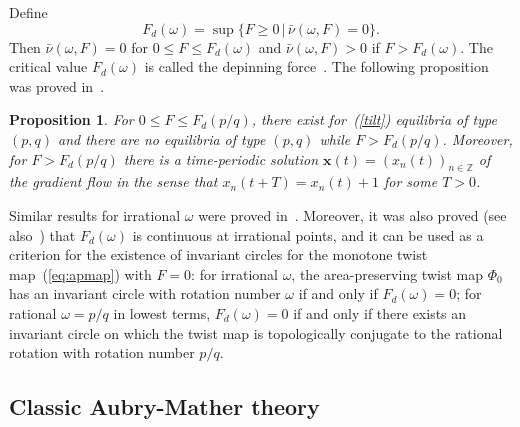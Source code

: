 \documentclass[12pt]{article}
\newcommand{\Z}{\mathbb{Z}}
\newcounter{number}
\newtheorem{proposition}{Proposition}
\newcommand{\begpro}{\begin{proposition}\hspace{1em}}
\newcommand{\epro}{\end{proposition}
   \addtocounter{number}{1}}
\newcommand{\begeq}{\begin{equation}}
\newcommand{\eeq}{\end{equation}}
\newcommand{\refer}[1]{~(\ref{#1})}
\newcommand{\xbf}{{\mathbf{x}}}
\newcommand{\nubar}{{\bar{\nu}}}
\newcommand{\RSM}{\textcolor{red}}
\begin{document}
  Define
  \begeq\label{dep_force}
  F_d(\omega)=\sup\{F\geq 0\,|\,\nubar(\omega,F)=0\}.
  \eeq
  Then $\nubar(\omega,F)=0$ for $0\leq F\leq F_d(\omega)$ and $\nubar(\omega,F)>0$ if $F>F_d(\omega)$.  The critical value $F_d(\omega)$ is called the depinning force~\cite{BM,BK,FM,Mac,PA}. The following proposition was proved in~\cite{BM}.%
  \begpro\label{finite}
  For $0\leq F\leq F_d(p/q)$, there exist for\refer{tilt} equilibria of type $(p,q)$ and there are no equilibria of type $(p,q)$ while $F>F_d(p/q)$. Moreover, for $F>F_d(p/q)$ there is a time-periodic solution $\xbf(t)=(x_n(t))_{n\in\Z}$ of the gradient flow in the sense that $x_n(t+T) = x_n(t)+1$ for some $T>0$.  %
  \epro

  Similar results for irrational $\omega$ were proved in~\cite{QW1}. Moreover, it was also proved (see also~\cite{WMWQ}) that $F_d(\omega)$ is continuous at irrational points, and it can be used as a criterion for the existence of invariant circles for the monotone twist map\refer{eq:apmap} with $F=0$: for irrational $\omega$, the area-preserving twist map $\Phi_0$  has an invariant circle with rotation number $\omega$ if and only if $F_d(\omega)=0$; for rational $\omega=p/q$ in lowest terms, $F_d(\omega)=0$ if and only if
there exists  an invariant circle on which the twist map is topologically conjugate to the rational rotation with rotation number $p/q$.


\subsection{Classic Aubry-Mather theory}\label{Sec:AM}
\end{document}
